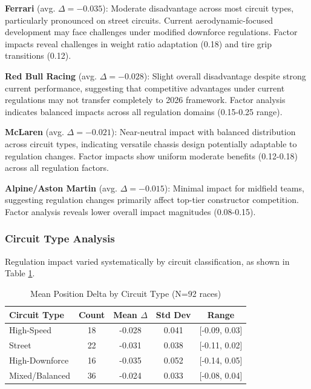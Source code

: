 \documentclass[conference]{IEEEtran}
\begin{document}
\textbf{Ferrari} (avg. $\Delta = -0.035$): Moderate disadvantage across most circuit types, particularly pronounced on street circuits. Current aerodynamic-focused development may face challenges under modified downforce regulations. Factor impacts reveal challenges in weight ratio adaptation (0.18) and tire grip transitions (0.12).

\textbf{Red Bull Racing} (avg. $\Delta = -0.028$): Slight overall disadvantage despite strong current performance, suggesting that competitive advantages under current regulations may not transfer completely to 2026 framework. Factor analysis indicates balanced impacts across all regulation domains (0.15-0.25 range).

\textbf{McLaren} (avg. $\Delta = -0.021$): Near-neutral impact with balanced distribution across circuit types, indicating versatile chassis design potentially adaptable to regulation changes. Factor impacts show uniform moderate benefits (0.12-0.18) across all regulation factors.

\textbf{Alpine/Aston Martin} (avg. $\Delta = -0.015$): Minimal impact for midfield teams, suggesting regulation changes primarily affect top-tier constructor competition. Factor analysis reveals lower overall impact magnitudes (0.08-0.15).

\subsubsection{Circuit Type Analysis}

Regulation impact varied systematically by circuit classification, as shown in Table \ref{tab:circuit_impact}.

\begin{table}[h]
\centering
\caption{Mean Position Delta by Circuit Type (N=92 races)}
\begin{tabular}{lcccc}
\toprule
\textbf{Circuit Type} & \textbf{Count} & \textbf{Mean $\Delta$} & \textbf{Std Dev} & \textbf{Range} \\
\midrule
High-Speed & 18 & -0.028 & 0.041 & [-0.09, 0.03] \\
Street & 22 & -0.031 & 0.038 & [-0.11, 0.02] \\
High-Downforce & 16 & -0.035 & 0.052 & [-0.14, 0.05] \\
Mixed/Balanced & 36 & -0.024 & 0.033 & [-0.08, 0.04] \\
\bottomrule
\end{tabular}
\label{tab:circuit_impact}
\end{table}
\end{document}

